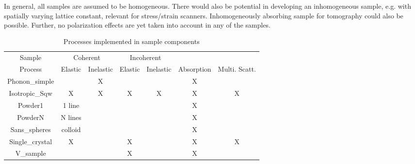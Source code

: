 In general, all samples are assumed to be homogeneous. There would also be
potential in developing an inhomogeneous sample, e.g. with
spatially varying lattice constant, relevant for stress/strain scanners.
Inhomogeneously absorbing sample for tomography could also be possible.
Further, no polarization effects are yet taken into account in any
of the samples.

\begin{table}
  \begin{center}
  {\let\my=\\
    \begin{tabular}{|c|cc|cc|c|c|}
    \hline
    Sample        & \multicolumn{2}{c|}{Coherent} & \multicolumn{2}{c|}{Incoherent} &&\\
    Process       & Elastic & Inelastic & Elastic & Inelastic & Absorption & Multi. Scatt.\\
    \hline
    Phonon\_simple&         & X         &         &           & X & \\
    Isotropic\_Sqw&  X      & X         & X       & X         & X & X \\
    Powder1       &  1 line &           &         &           & X & \\
    PowderN       &  N lines&           &         &           & X & \\
    Sans\_spheres &  colloid&           &         &           & X & \\
    Single\_crystal& X      &           & X       &           & X & X \\
    V\_sample     &         &           & X       &           & X & \\
    \hline
    \end{tabular}
    \caption{Processes implemented in sample components}
    \label{t:sample-process}
  }
  \end{center}
\end{table}







%

